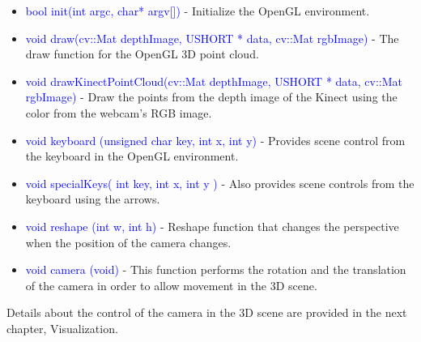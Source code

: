\begin{itemize}
	\item \textcolor{blue}{bool init(int argc, char* argv[]) } - Initialize the OpenGL environment. 
	\item \textcolor{blue}{void draw(cv::Mat depthImage, USHORT * data, cv::Mat rgbImage)} - The draw function for the OpenGL 3D point cloud. 
	\item \textcolor{blue}{void drawKinectPointCloud(cv::Mat depthImage, USHORT * data, cv::Mat rgbImage)} - Draw the points from the depth image of the Kinect using the color from the webcam's RGB image. 
	\item \textcolor{blue}{void keyboard (unsigned char key, int x, int y) } - Provides scene control from the keyboard in the OpenGL environment.  
	\item \textcolor{blue}{void specialKeys( int key, int x, int y ) } - Also provides scene controls from the keyboard using the arrows. 
	\item \textcolor{blue}{void reshape (int w, int h)} - Reshape function that changes the perspective when the position of the camera changes. 
	\item \textcolor{blue}{void camera (void) } - This function performs the rotation and the translation of the camera in order to allow movement in the 3D scene. 
\end{itemize}

\noindent
Details about the control of the camera in the 3D scene are provided in the next chapter, Visualization. 
